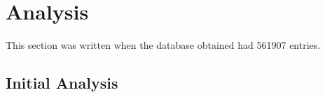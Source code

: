 \chapter{Analysis}
This section was written when the database obtained had 561907 entries. 

\section{Initial Analysis}

